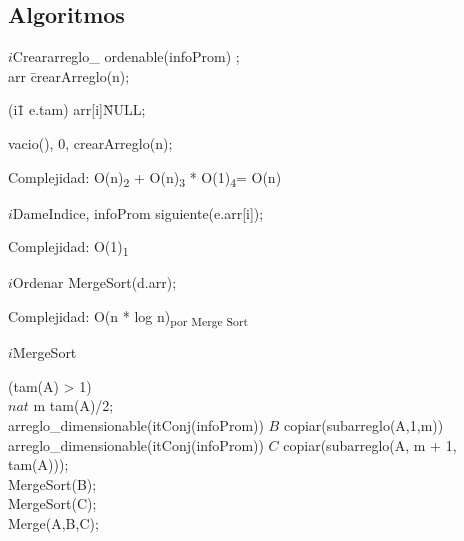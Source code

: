 \subsection{Algoritmos}
	\begin{algorithm}{$i$Crear}{}{arreglo\_ ordenable(infoProm)}
		;\\
		arr \= crearArreglo(n); \\
		\begin{FOR}{(i\=1 \TO e.tam)}
			arr[i]\=NULL;
		\end{FOR}
		\RETURN \langle vacio(), 0, crearArreglo(n)\rangle;
	\end{algorithm}
	Complejidad:  O(n)\textsubscript{2} + O(n)\textsubscript{3} * O(1)\textsubscript{4}= O(n)
	 \\

	\begin{algorithm}{$i$DameIndice}{, }{infoProm}
		\RETURN siguiente(e.arr[i]);
	\end{algorithm}
	Complejidad:  O(1)\textsubscript{1}
	 \\

	\begin{algorithm}{$i$Ordenar}{}{}
	\RETURN MergeSort(d.arr);
	\end{algorithm}
	Complejidad:  O(n * log n)\textsubscript{por Merge Sort}
	\\


	\begin{algorithm}{$i$MergeSort}{}{}
		\begin{IF}{(tam(A) > 1)} \\
			$nat$ m \leftarrow tam(A)/2; \\
			arreglo\_dimensionable(itConj(infoProm)) $B$ \leftarrow copiar(subarreglo(A,1,m)) \\
			arreglo\_dimensionable(itConj(infoProm)) $C$ \leftarrow copiar(subarreglo(A, m + 1, tam(A))); \\
			MergeSort(B); \\
			MergeSort(C); \\
			Merge(A,B,C); \\
		\end{IF}
	\end{algorithm}
	
